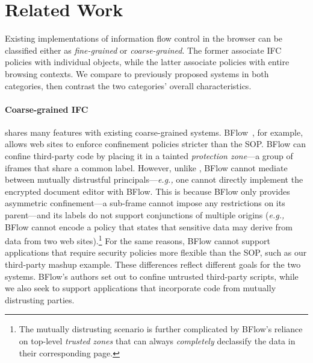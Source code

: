 \section{Related Work}
\label{sec:related}

Existing implementations of information flow control in the browser
can be classified either as \emph{fine-grained} or
\emph{coarse-grained}. The former associate IFC policies with
individual objects, while the latter associate policies with entire
browsing contexts. We compare \sys{} to previously proposed systems
in both categories, then contrast the two categories' overall
characteristics.

\paragraph{Coarse-grained IFC} \sys{} shares many features
with existing coarse-grained systems.
%
BFlow~\cite{Yip:2009:PBS}, for example, allows web sites to enforce confinement policies
stricter than the SOP\@.
%
BFlow can confine third-party code by placing
it in a tainted \emph{protection zone}---a group
of iframes that share a common label.
%
However, unlike \sys{}, BFlow cannot mediate between mutually
distrustful principals---\emph{e.g.,} one cannot directly implement the
encrypted document editor with BFlow.
%
This is because BFlow only provides asymmetric confinement---a
sub-frame cannot impose any restrictions on its parent---and its
labels do not support conjunctions of multiple origins (\emph{e.g.,}
BFlow cannot encode a policy that states that sensitive data may
derive from data from two web sites).\footnote{ The mutually
  distrusting scenario is further complicated by BFlow's reliance on
  top-level \emph{trusted zones} that can always \emph{completely}
  declassify the data in their corresponding page.}
%
For the same reasons, BFlow cannot support applications that require
security policies more flexible than the SOP, such as our third-party
mashup example.
%
These differences reflect different goals for the two systems. BFlow's
authors set out to confine untrusted third-party scripts, while we
also seek to support applications that incorporate code from mutually
distrusting parties.


